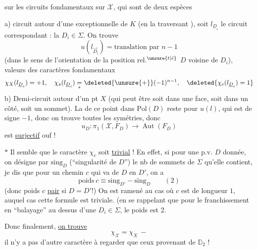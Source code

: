 sur les circuits fondamentaux sur $\mathscr X$, qui sont de deux espèces

a)  circuit autour d'une  exceptionnelle de $K$ (en la traversant  ), soit $l_{\underline D_i}$ le circuit correspondant : la  $D_i\in\Sigma$. On trouve
\[
u(l_{\vec D_i})=\text{translation par }n-1
\]
(dans le sens de l'orientation de la position rel.$^{\unsure{t|\acute e}}$  $D$ voisine de $D_i$), valeurs des caractères fondamentaux
\[
\chi_X(l_{\underline D_i})=+1,\quad\chi_s(l_{\underline D_i})\underset{*}{=}\deleted{\unsure{+}}(-1)^{n-1},\quad\deleted{\chi_c(l_{\underline D_i})=1}
\]
b) Demi-circuit autour d'un pt  $X$ (qui peut être soit dans une face, soit dans un côté, soit  un sommet). La   de ce point dans $\mathrm{Pol}(D)$ reste  pour $u(l)$, qui est de signe $-1$, donc on trouve toutes les symétries, donc
\[
u_D:\pi_1(\mathscr X,F_D)\longrightarrow\operatorname{Aut}(F_D)
\]
est \uline{surjectif} \quad ouf !

$*$ Il semble que le caractère $\chi_c$ soit \uline{trivial} ! En effet, si pour une p.v. $D$ donnée, on désigne par $\mathrm{sing}_D$ (``singularité de $D$'') le nb de sommets de $\Sigma$ qu'elle contient, je dis que pour un chemin $c$ qui va de $D$ en $D'$, on a
\[
\mathrm{poids}\ c\equiv\mathrm{sing}_{D'}-\mathrm{sing}_D\qquad(2)
\]
(donc poids $c$ \uline{pair} si $D=D'$!) On est ramené au cas où $c$ est de longueur $1$, auquel cas cette formule est triviale. (en se rappelant que pour le franchissement  en ``balayage'' au dessus d'une  $D_i\in\Sigma$, le poids est 2.

Donc finalement, \uline{on trouve}
\[
\boxed{\chi_{\mathscr X}=\chi_X\ -}
\]
il n'y a pas d'autre caractère à regarder que ceux provenant de $\mathbb D_2$ !
